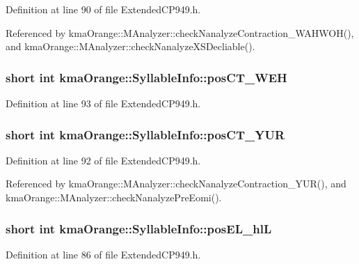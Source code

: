 Definition at line 90 of file ExtendedCP949.h.

Referenced by kmaOrange::MAnalyzer::checkNanalyzeContraction\_\-WAHWOH(), and kmaOrange::MAnalyzer::checkNanalyzeXSDecliable().\hypertarget{structkmaOrange_1_1SyllableInfo_3e25ef463351473cb9c411ee5241f184}{
\subsubsection[{posCT\_\-WEH}]{\setlength{\rightskip}{0pt plus 5cm}short int {\bf kmaOrange::SyllableInfo::posCT\_\-WEH}}}
\label{structkmaOrange_1_1SyllableInfo_3e25ef463351473cb9c411ee5241f184}




Definition at line 93 of file ExtendedCP949.h.\hypertarget{structkmaOrange_1_1SyllableInfo_b1ef6f78c941b0b2ff3bbee682d1b57f}{
\subsubsection[{posCT\_\-YUR}]{\setlength{\rightskip}{0pt plus 5cm}short int {\bf kmaOrange::SyllableInfo::posCT\_\-YUR}}}
\label{structkmaOrange_1_1SyllableInfo_b1ef6f78c941b0b2ff3bbee682d1b57f}




Definition at line 92 of file ExtendedCP949.h.

Referenced by kmaOrange::MAnalyzer::checkNanalyzeContraction\_\-YUR(), and kmaOrange::MAnalyzer::checkNanalyzePreEomi().\hypertarget{structkmaOrange_1_1SyllableInfo_0dd31a35a69439084e9cd4de0b78bcab}{
\subsubsection[{posEL\_\-hlL}]{\setlength{\rightskip}{0pt plus 5cm}short int {\bf kmaOrange::SyllableInfo::posEL\_\-hlL}}}
\label{structkmaOrange_1_1SyllableInfo_0dd31a35a69439084e9cd4de0b78bcab}




Definition at line 86 of file ExtendedCP949.h.

